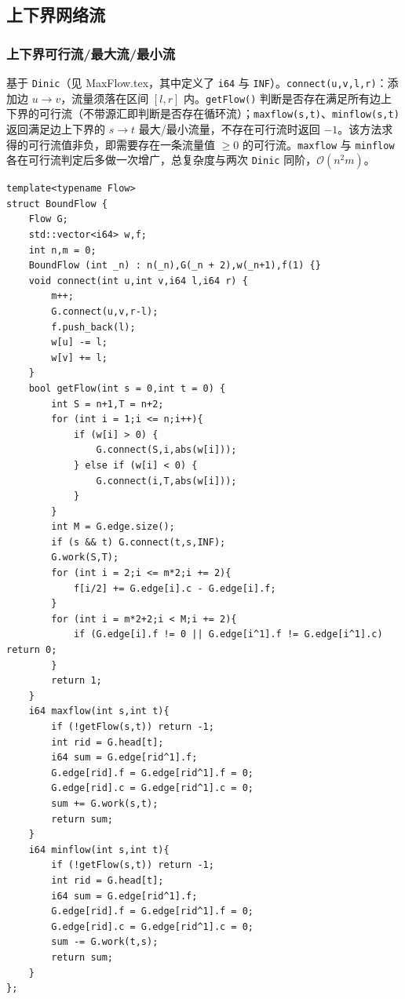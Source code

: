 \subsection{上下界网络流}

\subsubsection{上下界可行流/最大流/最小流}

基于 \texttt{Dinic}（见 MaxFlow.tex，其中定义了 \texttt{i64} 与 \texttt{INF}）。\texttt{connect(u,v,l,r)}：添加边 $u\to v$，流量须落在区间 $[l,r]$ 内。\texttt{getFlow()} 判断是否存在满足所有边上下界的可行流（不带源汇即判断是否存在循环流）；\texttt{maxflow(s,t)}、\texttt{minflow(s,t)} 返回满足边上下界的 $s\to t$ 最大/最小流量，不存在可行流时返回 $-1$。该方法求得的可行流值非负，即需要存在一条流量值 $\ge 0$ 的可行流。\texttt{maxflow} 与 \texttt{minflow} 各在可行流判定后多做一次增广，总复杂度与两次 \texttt{Dinic} 同阶，$\mathcal{O}(n^2m)$。

\begin{lstlisting}
template<typename Flow>
struct BoundFlow {
    Flow G;
    std::vector<i64> w,f;
    int n,m = 0;
    BoundFlow (int _n) : n(_n),G(_n + 2),w(_n+1),f(1) {}
    void connect(int u,int v,i64 l,i64 r) {
        m++;
        G.connect(u,v,r-l);
        f.push_back(l);
        w[u] -= l;
        w[v] += l;
    }
    bool getFlow(int s = 0,int t = 0) {
        int S = n+1,T = n+2;
        for (int i = 1;i <= n;i++){
            if (w[i] > 0) {
                G.connect(S,i,abs(w[i]));
            } else if (w[i] < 0) {
                G.connect(i,T,abs(w[i]));
            }
        }
        int M = G.edge.size();
        if (s && t) G.connect(t,s,INF);
        G.work(S,T);
        for (int i = 2;i <= m*2;i += 2){
            f[i/2] += G.edge[i].c - G.edge[i].f;
        }
        for (int i = m*2+2;i < M;i += 2){
            if (G.edge[i].f != 0 || G.edge[i^1].f != G.edge[i^1].c) return 0;
        }
        return 1;
    }
    i64 maxflow(int s,int t){
        if (!getFlow(s,t)) return -1;
        int rid = G.head[t];
        i64 sum = G.edge[rid^1].f;
        G.edge[rid].f = G.edge[rid^1].f = 0;
        G.edge[rid].c = G.edge[rid^1].c = 0;
        sum += G.work(s,t);
        return sum;
    }
    i64 minflow(int s,int t){
        if (!getFlow(s,t)) return -1;
        int rid = G.head[t];
        i64 sum = G.edge[rid^1].f;
        G.edge[rid].f = G.edge[rid^1].f = 0;
        G.edge[rid].c = G.edge[rid^1].c = 0;
        sum -= G.work(t,s);
        return sum;
    }
};
\end{lstlisting}